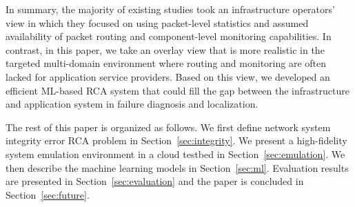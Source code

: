 In summary, the majority of existing studies took an infrastructure operators' view in which they focused on using packet-level statistics and assumed availability of packet routing and component-level monitoring capabilities. 
In contrast, in this paper, we take an overlay view that is more realistic in the targeted multi-domain environment where routing and monitoring are often lacked for application service providers. Based on this view, we developed 
an efficient ML-based RCA system that could fill the gap between the infrastructure and application system in failure diagnosis and localization.

The rest of this paper is organized as follows. We first define network system integrity error RCA problem in Section~\ref{sec:integrity}. We present a high-fidelity system emulation environment in a cloud testbed in Section~\ref{sec:emulation}. We then describe the machine learning models in Section~\ref{sec:ml}. Evaluation results are presented in Section~\ref{sec:evaluation} and the paper is concluded in Section~\ref{sec:future}.

